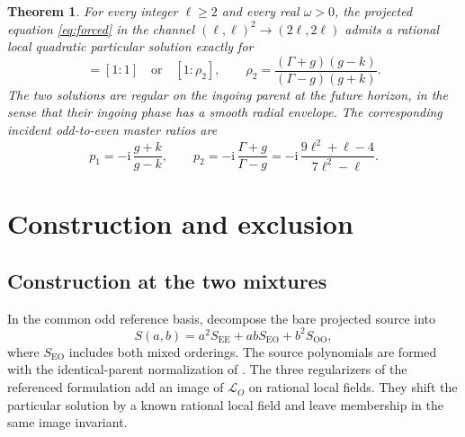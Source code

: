 \documentclass[11pt]{article}
\newtheorem{theorem}{Theorem}
\newcommand{\ii}{\mathrm{i}}
\newcommand{\EE}{\mathrm{EE}}
\newcommand{\EO}{\mathrm{EO}}
\newcommand{\OO}{\mathrm{OO}}
\begin{document}
\begin{theorem}
\label{thm:two}
For every integer \(\ell\geq2\) and every real \(\omega>0\), the projected equation \eqref{eq:forced} in the channel \((\ell,\ell)^2\to(2\ell,2\ell)\) admits a rational local quadratic particular solution exactly for
\begin{equation}
 [a:b]=[1:1]\quad\text{or}\quad[1:\rho_2],\qquad
 \rho_2=\frac{(\Gamma+g)(g-k)}{(\Gamma-g)(g+k)} .
 \label{eq:roots}
\end{equation}
The two solutions are regular on the ingoing parent at the future horizon, in the sense that their ingoing phase has a smooth radial envelope.
The corresponding incident odd-to-even master ratios are
\begin{equation}
 p_1=-\ii\,\frac{g+k}{g-k},\qquad
 p_2=-\ii\,\frac{\Gamma+g}{\Gamma-g}
     =-\ii\,\frac{9\ell^2+\ell-4}{7\ell^2-\ell}.
 \label{eq:masterratios}
\end{equation}
\end{theorem}

\section{Construction and exclusion}
\label{sec:proof}

\subsection{Construction at the two mixtures}

In the common odd reference basis, decompose the bare projected source into
\begin{equation}
 S(a,b)=a^2 S_{\EE}+ab S_{\EO}+b^2 S_{\OO},
 \label{eq:source}
\end{equation}
where \(S_{\EO}\) includes both mixed orderings.
The source polynomials are formed with the identical-parent normalization of \cite{bucciotti}.
The three regularizers of the referenced formulation add an image of \(\mathcal L_O\) on rational local fields.
They shift the particular solution by a known rational local field and leave membership in the same image invariant.
\end{document}
